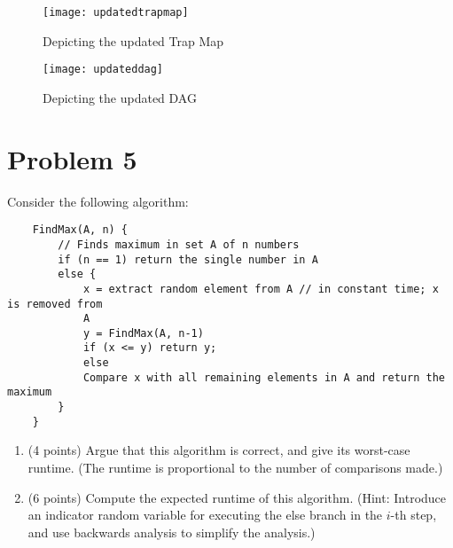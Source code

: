 \documentclass[11pt]{article}
\begin{document}
\begin{figure}[h]
    \centering
    \texttt{[image: updatedtrapmap]}
    \caption{Depicting the updated Trap Map}
    \label{fig:updatedtrapmap}
\end{figure}

\begin{figure}[h]
    \centering
    \texttt{[image: updateddag]}
    \caption{Depicting the updated DAG}
    \label{fig:updateddag}
\end{figure}

\newpage
\section*{Problem 5}

Consider the following algorithm:

\begin{verbatim}
    FindMax(A, n) {
        // Finds maximum in set A of n numbers
        if (n == 1) return the single number in A
        else {
            x = extract random element from A // in constant time; x is removed from
            A
            y = FindMax(A, n-1)
            if (x <= y) return y;
            else
            Compare x with all remaining elements in A and return the maximum
        }
    }
\end{verbatim}

\begin{enumerate}

\item (4 points) Argue that this algorithm is correct, and give its worst-case
    runtime. (The runtime is proportional to the number of comparisons made.)

\item (6 points) Compute the expected runtime of this algorithm.  (Hint:
    Introduce an indicator random variable for executing the else branch in the
        $i$-th step, and use backwards analysis to simplify the analysis.)

\end{enumerate}
\answer
\end{document}
